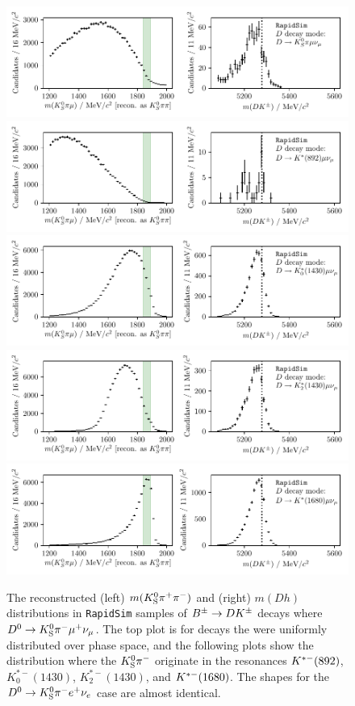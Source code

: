 \begin{figure}[tbp]
    \centering
    \includegraphics[width=0.8\columnwidth]{figures/analysis/background_checks/semilep_D_mu_PHSP.pdf}
    \includegraphics[width=0.8\columnwidth]{figures/analysis/background_checks/semilep_D_mu_892.pdf}
    \includegraphics[width=0.8\columnwidth]{figures/analysis/background_checks/semilep_D_mu_1430.pdf}
    \includegraphics[width=0.8\columnwidth]{figures/analysis/background_checks/semilep_D_mu_1430_2.pdf}
    \includegraphics[width=0.8\columnwidth]{figures/analysis/background_checks/semilep_D_mu_1680.pdf}
    \caption{The reconstructed (left) $m({{K}^0_{\mathrm{S}}} \pi^+ \pi^-)$ and (right) $m(Dh)$ distributions in \texttt{RapidSim} samples of ${{B}^\pm}\rightarrow{\ensuremath{D}} {\ensuremath{{K}^\pm}}$ decays where ${{D}^0}\rightarrow{\ensuremath{{K}^0_{\mathrm{S}}}}\pi^-\mu^+\nu_\mu$. The top plot is for  decays the were uniformly distributed over phase space, and the following plots show the distribution where the ${{K}^0_{\mathrm{S}}}{{\pi}^-}$ originate in the resonances ${{K}^{*-}}(892)$, $K^{*-}_0(1430)$, $K^{*-}_2(1430)$, and ${{K}^{*-}}(1680)$. The shapes for the ${{D}^0}\rightarrow{\ensuremath{{K}^0_{\mathrm{S}}}}\pi^-e^+\nu_e$ case are almost identical.}
    \label{fig:semileptonic_D_decays_kspp}
\end{figure}

